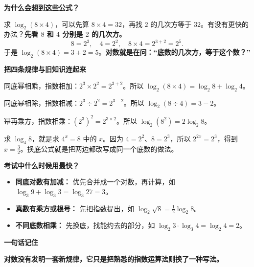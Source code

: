 \begin{explanationbox}
	\textbf{\textcolor{CExplanation}{为什么会想到这些公式？}}

	求 $\log_2(8\times4)$，可以先算 $8\times4=32$，再找 $2$ 的几次方等于 $32$。有没有更快的办法？\textbf{先看 $8$ 和 $4$ 分别是 $2$ 的几次方。}
	\[
		8=2^3,\quad 4=2^2,\quad 8\times4=2^{3+2}=2^5.
	\]
	于是 $\log_2(8\times4)=3+2=5$。\textbf{对数就是在问：“底数的几次方，等于这个数？”}

	\medskip
	\textbf{\textcolor{CExplanation}{把四条规律与旧知识连起来}}
	\begin{description}[style=nextline, leftmargin=2.8em, labelsep=0.5em, itemsep=0.45em]
		\item[\textbf{乘法为什么变加法？}] 同底幂相乘，指数相加：$2^3\times2^2=2^{3+2}$。所以 $\log_2(8\times4)=\log_2 8+\log_2 4$。
		\item[\textbf{除法为什么变减法？}] 同底幂相除，指数相减：$2^3\div2^2=2^{3-2}$。所以 $\log_2(8\div4)=3-2$。
		\item[\textbf{指数为什么能提前？}] 幂再乘方，指数相乘：$(2^3)^2=2^{3\times2}$。所以 $\log_2(8^2)=2\log_2 8$。
		\item[\textbf{为什么能换底？}] 求 $\log_4 8$，就是求 $4^x=8$ 中的 $x$。因为 $4=2^2$、$8=2^3$，所以 $2^{2x}=2^3$，得到 $x=\frac32$。换底公式就是把两边都改写成同一个底数的做法。
	\end{description}

	\medskip
	\textbf{\textcolor{CExplanation}{考试中什么时候用最快？}}
	\begin{itemize}[leftmargin=*, itemsep=0.45em, topsep=0.35em]
		\item \textbf{同底对数有加减：} 优先合并成一个对数，再计算，如 $\log_3 9+\log_3 3=\log_3 27=3$。
		\item \textbf{真数有乘方或根号：} 先把指数提出，如 $\log_2\sqrt8=\frac12\log_2 8$。
		\item \textbf{不同底数相乘：} 先换底，找能约去的部分，如 $\log_2 3\cdot\log_3 4=\log_2 4=2$。
	\end{itemize}

	\textbf{\textcolor{CExplanation}{一句话记住}}

	\textbf{对数没有发明一套新规律，它只是把熟悉的指数运算法则换了一种写法。}
\end{explanationbox}
